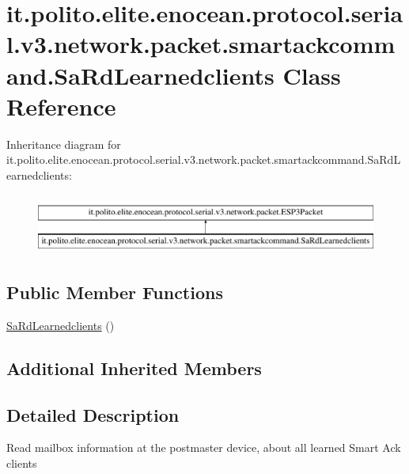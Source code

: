 \hypertarget{classit_1_1polito_1_1elite_1_1enocean_1_1protocol_1_1serial_1_1v3_1_1network_1_1packet_1_1smarta3fc26adfd93544996f2a731385cfeb74}{}\section{it.\+polito.\+elite.\+enocean.\+protocol.\+serial.\+v3.\+network.\+packet.\+smartackcommand.\+Sa\+Rd\+Learnedclients Class Reference}
\label{classit_1_1polito_1_1elite_1_1enocean_1_1protocol_1_1serial_1_1v3_1_1network_1_1packet_1_1smarta3fc26adfd93544996f2a731385cfeb74}
Inheritance diagram for it.\+polito.\+elite.\+enocean.\+protocol.\+serial.\+v3.\+network.\+packet.\+smartackcommand.\+Sa\+Rd\+Learnedclients\+:\begin{figure}[H]
\begin{center}
\leavevmode
\includegraphics[height=2.000000cm]{classit_1_1polito_1_1elite_1_1enocean_1_1protocol_1_1serial_1_1v3_1_1network_1_1packet_1_1smarta3fc26adfd93544996f2a731385cfeb74}
\end{center}
\end{figure}
\subsection*{Public Member Functions}
\begin{DoxyCompactItemize}
\item 
\hyperlink{classit_1_1polito_1_1elite_1_1enocean_1_1protocol_1_1serial_1_1v3_1_1network_1_1packet_1_1smarta3fc26adfd93544996f2a731385cfeb74_ab4fc579aab4010d715f8e6dbd3641076}{Sa\+Rd\+Learnedclients} ()
\end{DoxyCompactItemize}
\subsection*{Additional Inherited Members}


\subsection{Detailed Description}
Read mailbox information at the postmaster device, about all learned Smart Ack clients

